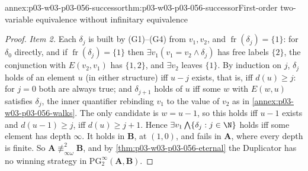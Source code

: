 \begin{annexitem}{annex:p03-w03-p03-056-successor}{thm:p03-w03-p03-056-successor}{First-order two-variable equivalence without infinitary equivalence}
\begin{proof}
\emph{Item 2.} Each \(\delta_j\) is built by (G1)--(G4) from \(v_1,v_2\), and
\(\operatorname{fr}(\delta_j)=\{1\}\): for \(\delta_0\) directly, and if
\(\operatorname{fr}(\delta_j)=\{1\}\) then
\(\exists v_1(v_1=v_2\land\delta_j)\) has free labels \(\{2\}\), the
conjunction with \(E(v_2,v_1)\) has \(\{1,2\}\), and \(\exists v_2\) leaves
\(\{1\}\). By induction on \(j\), \(\delta_j\) holds of an element \(u\) (in
either structure) iff \(u-j\) exists, that is, iff \(d(u)\geq j\): for
\(j=0\) both are always true; and \(\delta_{j+1}\) holds of \(u\) iff some
\(w\) with \(E(w,u)\) satisfies \(\delta_j\), the inner quantifier
rebinding \(v_1\) to the value of \(v_2\) as in
\cref{annex:p03-w03-p03-056-walks}. The only candidate is \(w=u-1\), so this
holds iff \(u-1\) exists and \(d(u-1)\geq j\), iff \(d(u)\geq j+1\).
Hence \(\exists v_1\bigwedge\{\delta_j:j\in\N\}\) holds iff some element has
depth \(\infty\). It holds in \(\mathbf B\), at \((1,0)\), and fails in
\(\mathbf A\), where every depth is finite. So
\(\mathbf A\not\equiv^2_{\infty\omega}\mathbf B\), and by
\cref{thm:p03-w03-p03-056-eternal} the Duplicator has no winning strategy in
\(\mathrm{PG}^\infty_2(\mathbf A,\mathbf B)\).
\end{proof}
\end{annexitem}


